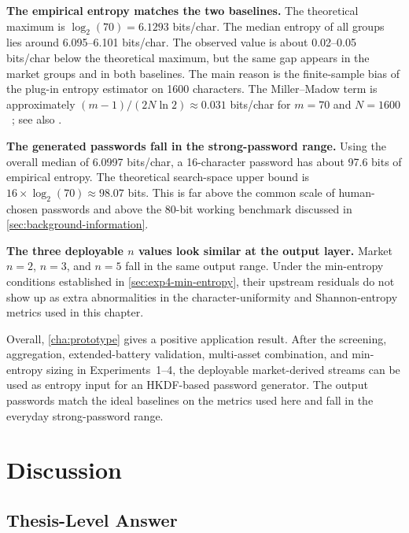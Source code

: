 \documentclass[11pt,titlepage,openany,oneside]{book}  %
\begin{document}
\textbf{The empirical entropy matches the two baselines.} The theoretical maximum is $\log_2(70) = 6.1293$ bits/char. The median entropy of all groups lies around 6.095--6.101 bits/char. The observed value is about 0.02--0.05 bits/char below the theoretical maximum, but the same gap appears in the market groups and in both baselines. The main reason is the finite-sample bias of the plug-in entropy estimator on 1600 characters. The Miller--Madow term is approximately $(m-1)/(2N\ln 2) \approx 0.031$ bits/char for $m=70$ and $N=1600$~\citep{miller1955entropy}; see also \citet{paninski2003entropy}.

\textbf{The generated passwords fall in the strong-password range.} Using the overall median of 6.0997 bits/char, a 16-character password has about 97.6 bits of empirical entropy. The theoretical search-space upper bound is $16 \times \log_2(70) \approx 98.07$ bits. This is far above the common scale of human-chosen passwords and above the 80-bit working benchmark discussed in \cref{sec:background-information}.

\textbf{The three deployable $n$ values look similar at the output layer.} Market $n=2$, $n=3$, and $n=5$ fall in the same output range. Under the min-entropy conditions established in \cref{sec:exp4-min-entropy}, their upstream residuals do not show up as extra abnormalities in the character-uniformity and Shannon-entropy metrics used in this chapter.

Overall, \cref{cha:prototype} gives a positive application result. After the screening, aggregation, extended-battery validation, multi-asset combination, and min-entropy sizing in Experiments~1--4, the deployable market-derived streams can be used as entropy input for an HKDF-based password generator. The output passwords match the ideal baselines on the metrics used here and fall in the everyday strong-password range.

\chapter{Discussion}
\label{cha:discussion}

\section{Thesis-Level Answer}
\label{sec:linking-results-rq}
\end{document}
